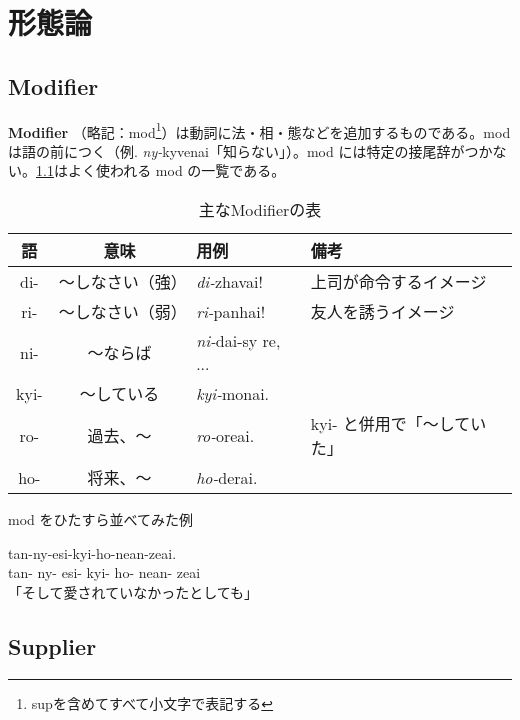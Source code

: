 \chapter{形態論}

\section{Modifier}
\textbf{Modifier} （略記：mod\footnote{supを含めてすべて小文字で表記する}）は動詞に法・相・態などを追加するものである。mod は語の前につく（例. \emph{ny-}kyvenai「知らない」）。mod には特定の接尾辞がつかない。\cref{table:common-mods}はよく使われる mod の一覧である。

\begin{table}[H]
    \centering
    \caption{主なModifierの表}
    \label{table:common-mods}
    \begin{tabular}{ccll}
        \toprule
        語 & 意味 & 用例 & 備考 \\
        \midrule
        di-  & ～しなさい（強） & \emph{di-}zhavai! & 上司が命令するイメージ \\
        ri-  & ～しなさい（弱） & \emph{ri-}panhai! & 友人を誘うイメージ\\
        ni-  & ～ならば   & \emph{ni-}dai-sy re, ...& \\
        kyi- & ～している & \emph{kyi-}monai. & \\
        ro-  & 過去、～   & \emph{ro-}oreai. & kyi- と併用で「～していた」\\
        ho-  & 将来、～   & \emph{ho-}derai. & \\
        \bottomrule
    \end{tabular}
\end{table}

\begin{itembox}[l]{mod をひたすら並べてみた例}
    \begin{pindent}
        tan-ny-esi-kyi-ho-nean-zeai. \\
        tan-
        ny-
        esi-
        kyi-
        ho-
        nean-
        zeai \\
        「そして愛されていなかったとしても」
    \end{pindent}
\end{itembox}

\section{Supplier}


